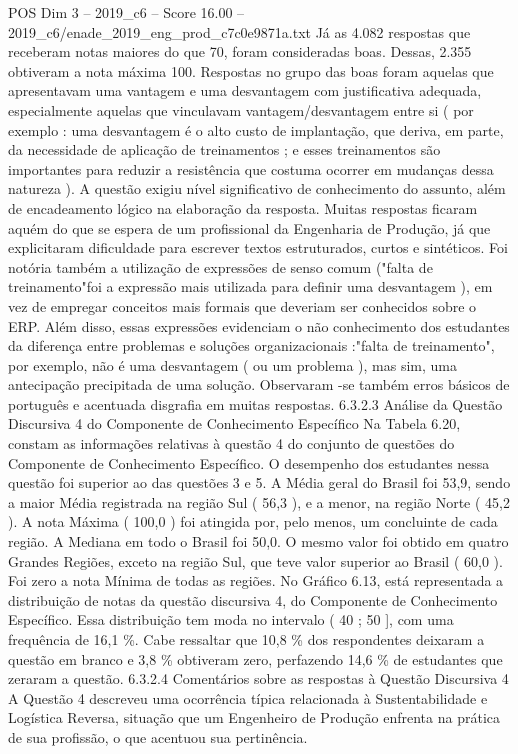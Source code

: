 \begin{textsample}{POS Dim 3 – 2019\_c6 – Score 16.00 – 2019\_c6/enade\_2019\_eng\_prod\_c7c0e9871a.txt}
Já as 4.082 respostas que receberam notas maiores do que 70, foram consideradas boas.
Dessas, 2.355 obtiveram a nota máxima 100.
Respostas no grupo das boas foram aquelas que apresentavam uma vantagem e uma desvantagem com justificativa adequada, especialmente aquelas que vinculavam vantagem/desvantagem entre si ( por exemplo : uma desvantagem é o alto custo de implantação, que deriva, em parte, da necessidade de aplicação de treinamentos ; e esses treinamentos são importantes para reduzir a resistência que costuma ocorrer em mudanças dessa natureza ).
A questão exigiu nível significativo de conhecimento do assunto, além de encadeamento lógico na elaboração da resposta.
Muitas respostas ficaram aquém do que se espera de um profissional da Engenharia de Produção, já que explicitaram dificuldade para escrever textos estruturados, curtos e sintéticos.
Foi notória também a utilização de expressões de senso comum ("falta de treinamento"foi a expressão mais utilizada para definir uma desvantagem ), em vez de empregar conceitos mais formais que deveriam ser conhecidos sobre o ERP.
Além disso, essas expressões evidenciam o não conhecimento dos estudantes da diferença entre problemas e soluções organizacionais :"falta de treinamento", por exemplo, não é uma desvantagem ( ou um problema ), mas sim, uma antecipação precipitada de uma solução.
Observaram -se também erros básicos de português e acentuada disgrafia em muitas respostas. 6.3.2.3 Análise da Questão Discursiva 4 do Componente de Conhecimento Específico Na Tabela 6.20, constam as informações relativas à questão 4 do conjunto de questões do Componente de Conhecimento Específico.
O desempenho dos estudantes nessa questão foi superior ao das questões 3 e 5.
A Média geral do Brasil foi 53,9, sendo a maior Média registrada na região Sul ( 56,3 ), e a menor, na região Norte ( 45,2 ).
A nota Máxima ( 100,0 ) foi atingida por, pelo menos, um concluinte de cada região.
A Mediana em todo o Brasil foi 50,0.
O mesmo valor foi obtido em quatro Grandes Regiões, exceto na região Sul, que teve valor superior ao Brasil ( 60,0 ).
Foi zero a nota Mínima de todas as regiões.
No Gráfico 6.13, está representada a distribuição de notas da questão discursiva 4, do Componente de Conhecimento Específico.
Essa distribuição tem moda no intervalo ( 40 ; 50 ], com uma frequência de 16,1 \%.
Cabe ressaltar que 10,8 \% dos respondentes deixaram a questão em branco e 3,8 \% obtiveram zero, perfazendo 14,6 \% de estudantes que zeraram a questão. 6.3.2.4 Comentários sobre as respostas à Questão Discursiva 4 A Questão 4 descreveu uma ocorrência típica relacionada à Sustentabilidade e Logística Reversa, situação que um Engenheiro de Produção enfrenta na prática de sua profissão, o que acentuou sua pertinência.

\end{textsample}
